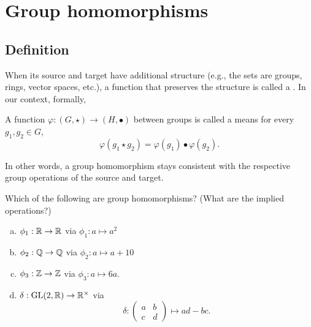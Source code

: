 \documentclass[../algebraNotesMSRI-UP2016.tex]{subfiles}
\begin{document}
\section[\S \thesection]{Group homomorphisms}\label{sec:2p6groupHomomorphisms}
\subsection[\subsecname]{Definition}
\begin{frame}{\subsecname}{}
When its source and target have additional structure (e.g., the sets are groups, rings, vector spaces, etc.), a function that preserves the structure is called a .  In our context, formally,
\begin{dfn}
A function $\varphi:(G,\star)\to(H,\bullet)$ between groups is called a  means for every $g_1,g_2\in G$,
\[
\varphi(g_1\star g_2)=\varphi(g_1)\bullet\varphi(g_2).
\]
\end{dfn}

\smallGap
In other words, a group homomorphism stays consistent with the respective group operations of the source and target.
\end{frame}

\begin{frame}[c]
\begin{exe}[cf. Problem 62]\label{exe:detExample}
Which of the following are group homomorphisms? (What are the implied operations?)
\begin{enumerate}[(a)]
\item $\phi_1:\mathbb R\to \mathbb R$ via $\phi_1:a\mapsto a^2$
\item $\phi_2:\mathbb Q\to \mathbb Q$ via $\phi_2:a\mapsto a+10$
\item $\phi_3:\mathbb Z\to \mathbb Z$ via $\phi_3:a\mapsto 6a$.
\item\label{expt:detExampled} $\delta:\operatorname{GL}(2,\mathbb R)\to \mathbb R^{\times}$ via 
\[
\delta: \begin{pmatrix}
	a & b \\
	c & d 
	\end{pmatrix}
	\mapsto ad-bc.
\]
\end{enumerate}
\end{exe}
\end{frame}

\end{document}
